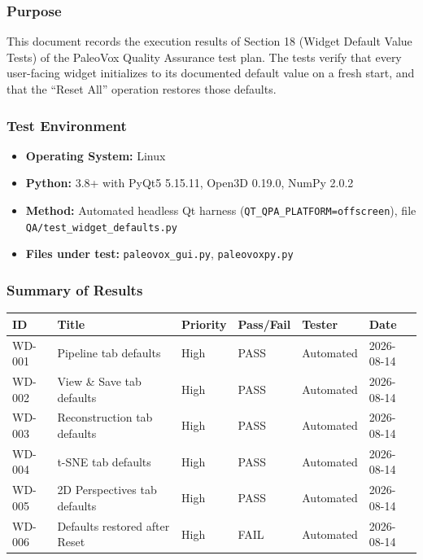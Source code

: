 \documentclass[12pt,a4paper]{article}
\begin{document}
\subsubsection{Purpose}
This document records the execution results of Section 18 (Widget Default
Value Tests) of the PaleoVox Quality Assurance test plan. The tests verify
that every user-facing widget initializes to its documented default value on a
fresh start, and that the ``Reset All'' operation restores those defaults.

\subsubsection{Test Environment}
\begin{itemize}
  \item \textbf{Operating System:} Linux
  \item \textbf{Python:} 3.8+ with PyQt5 5.15.11, Open3D 0.19.0, NumPy 2.0.2
  \item \textbf{Method:} Automated headless Qt harness
    (\texttt{QT\_QPA\_PLATFORM=offscreen}), file
    \texttt{QA/test\_widget\_defaults.py}
  \item \textbf{Files under test:} \texttt{paleovox\_gui.py},
    \texttt{paleovoxpy.py}
\end{itemize}

\subsubsection{Summary of Results}
\begin{longtable}{p{1.2cm}p{5.5cm}p{1.5cm}p{1.5cm}p{1.5cm}p{2cm}}
\toprule
\textbf{ID} & \textbf{Title} & \textbf{Priority} & \textbf{Pass/Fail} & \textbf{Tester} & \textbf{Date} \\
\midrule
WD-001 & Pipeline tab defaults          & High & PASS & Automated & 2026-08-14 \\
WD-002 & View \& Save tab defaults      & High & PASS & Automated & 2026-08-14 \\
WD-003 & Reconstruction tab defaults    & High & PASS & Automated & 2026-08-14 \\
WD-004 & t-SNE tab defaults             & High & PASS & Automated & 2026-08-14 \\
WD-005 & 2D Perspectives tab defaults   & High & PASS & Automated & 2026-08-14 \\
WD-006 & Defaults restored after Reset  & High & FAIL & Automated & 2026-08-14 \\
\bottomrule
\end{longtable}
\end{document}
